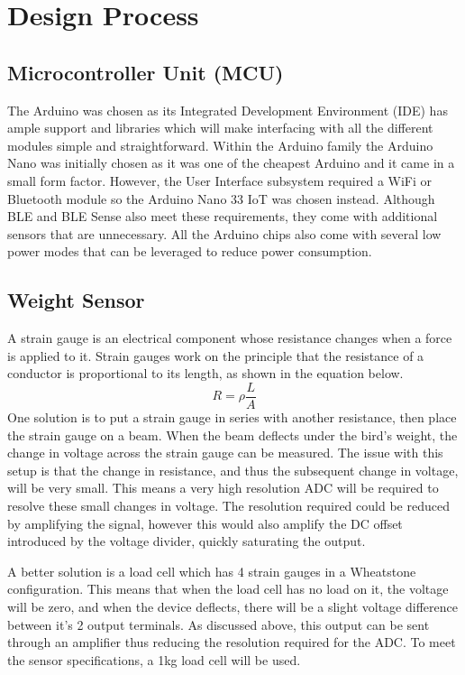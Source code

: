 \documentclass[class=report,11pt,crop=false]{standalone}
\begin{document}
	\section{Design Process}
	
	\subsection{Microcontroller Unit (MCU)}
	The Arduino was chosen as its Integrated Development Environment (IDE) has ample support and libraries which will make interfacing with all the different modules simple and straightforward. Within the Arduino family the Arduino Nano was initially chosen as it was one of the cheapest Arduino and it came in a small form factor. However, the User Interface subsystem required a WiFi or Bluetooth module so the Arduino Nano 33 IoT was chosen instead. Although BLE and BLE Sense also meet these requirements, they come with additional sensors that are unnecessary. All the Arduino chips also come with several low power modes that can be leveraged to reduce power consumption.
	
	\subsection{Weight Sensor}
	A strain gauge is an electrical component whose resistance changes when a force is applied to it. Strain gauges work on the principle that the resistance of a conductor is proportional to its length, as shown in the equation below. 
	\[R = \rho \frac{L}{A}\]
	One solution is to put a strain gauge in series with another resistance, then place the strain gauge on a beam. When the beam deflects under the bird’s weight, the change in voltage across the strain gauge can be measured. The issue with this setup is that the change in resistance, and thus the subsequent change in voltage, will be very small. This means a very high resolution ADC will be required to resolve these small changes in voltage. The resolution required could be reduced by amplifying the signal, however this would also amplify the DC offset introduced by the voltage divider, quickly saturating the output.
	
	A better solution is a load cell which has 4 strain gauges in a Wheatstone configuration. This means that when the load cell has no load on it, the voltage will be zero, and when the device deflects, there will be a slight voltage difference between it’s 2 output terminals. As discussed above, this output can be sent through an amplifier thus reducing the resolution required for the ADC. To meet the sensor specifications, a 1kg load cell will be used. 
	
\end{document}
